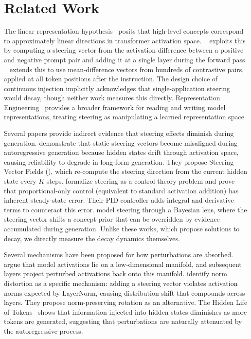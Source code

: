 \section{Related Work}
\label{sec:related_work}

The linear representation hypothesis~\citep{park2023linear,marks2023geometry}
posits that high-level concepts correspond to approximately linear directions
in transformer activation space. \actadd~\citep{turner2023actadd} exploits this
by computing a steering vector from the activation difference between a positive
and negative prompt pair and adding it at a single layer during the forward pass.
\caa~\citep{panickssery2024caa} extends this to use mean-difference vectors from
hundreds of contrastive pairs, applied at all token positions after the
instruction. The design choice of continuous injection implicitly acknowledges
that single-application steering would decay, though neither work measures this
directly. Representation Engineering~\citep{zou2023repe} provides a broader
framework for reading and writing model representations, treating steering as
manipulating a learned representation space.

Several papers provide indirect evidence that steering effects diminish during
generation. \citet{li2026svf} demonstrate that static steering vectors become
misaligned during autoregressive generation because hidden states drift through
activation space, causing reliability to degrade in long-form generation. They
propose Steering Vector Fields (\svf), which re-compute the steering direction
from the current hidden state every $K$ steps. \citet{nguyen2025pid} formalize
steering as a control theory problem and prove that proportional-only control
(equivalent to standard activation addition) has inherent steady-state error.
Their PID controller adds integral and derivative terms to counteract this error.
\citet{bigelow2025belief} model steering through a Bayesian lens, where the
steering vector shifts a concept prior that can be overridden by evidence
accumulated during generation. Unlike these works, which propose solutions
to decay, we directly measure the decay dynamics themselves.

Several mechanisms have been proposed for how perturbations are absorbed.
\citet{xu2026why} argue that model activations lie on a low-dimensional manifold,
and subsequent layers project perturbed activations back onto this manifold.
\citet{dang2026selective} identify norm distortion as a specific mechanism:
adding a steering vector violates activation norms expected by LayerNorm,
causing distribution shift that compounds across layers. They propose
norm-preserving rotation as an alternative. The Hidden Life of
Tokens~\citep{hiddentokens2025} shows that information injected into hidden
states diminishes as more tokens are generated, suggesting that perturbations
are naturally attenuated by the autoregressive process.

